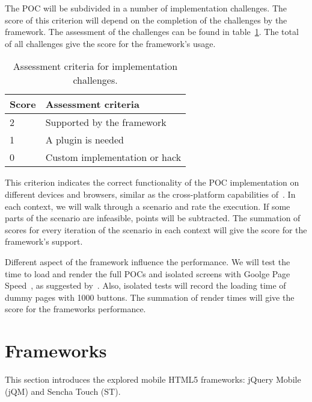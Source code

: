 \documentclass[a4paper]{artikel3}
\newcommand{\setspace}[0]{\vspace{2mm}}
\renewcommand{\paragraph}[1]{\setspace \noindent {\bf #1}  }
\begin{document}
\paragraph{Usage}
The POC will be subdivided in a number of implementation challenges.  
The score of this criterion will depend on the completion of the challenges by the framework.  
The assessment of the challenges can be found in table~\ref{table:challenges-scores}.  
The total of all challenges give the score for the framework's usage.

\begin{table}[h]	
\centering
\begin{tabular}{ll}
\toprule
\textbf{Score} & \textbf{Assessment criteria}\\
\midrule
2 & Supported by the framework\\
1 & A plugin is needed\\
0 & Custom implementation or hack\\
\bottomrule
\end{tabular}
\caption{Assessment criteria for implementation challenges.}
\label{table:challenges-scores}
\end{table}


\paragraph{Support}
This criterion indicates the correct functionality of the POC implementation on different devices and browsers,  similar as the cross-platform capabilities of~\cite{Sarrafi2012a}.  
In each context,  we will walk through a scenario and rate the execution.  
If some parts of the scenario are infeasible,  points will be subtracted.  
The summation of scores for every iteration of the scenario in each context will give the score for the framework's support.

\paragraph{Performance}
Different aspect of the framework influence the performance.  
We will test the time to load and render the full POCs and isolated screens with Goolge Page Speed~\cite{Google2012},  as suggested by~\cite{Morgan2011}.   
Also,  isolated tests will record the loading time of dummy pages with 1000 buttons.  
The summation of render times will give the score for the frameworks performance.

\section{Frameworks} %
\label{sec:frameworks}
This section introduces the explored mobile HTML5 frameworks: jQuery Mobile (jQM) and Sencha Touch (ST).
\end{document}

